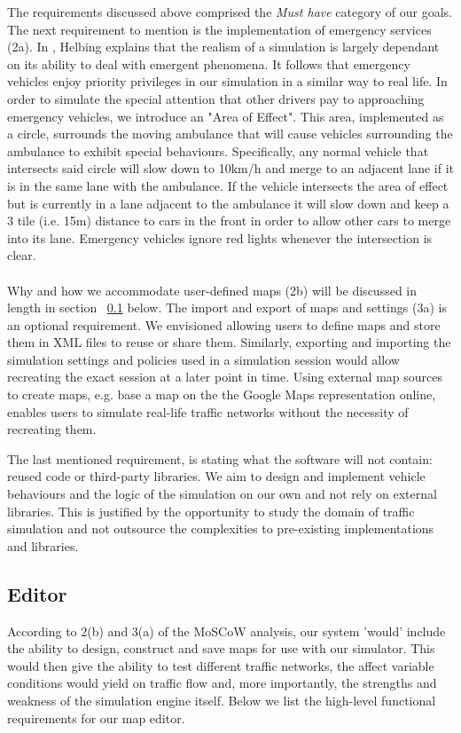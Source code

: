 The requirements discussed above comprised the \textit{Must have} category of our goals. The next requirement to mention is the implementation of emergency services (2a). In \cite{helbing2013agent}, Helbing explains that the realism of a simulation is largely dependant on its ability to deal with emergent phenomena. It follows that emergency vehicles enjoy priority privileges in our simulation in a similar way to real life. In order to simulate the special attention that other drivers pay to approaching emergency vehicles, we introduce an "Area of Effect". This area, implemented as a circle, surrounds the moving ambulance that will cause vehicles surrounding the ambulance to exhibit special behaviours. Specifically, any normal vehicle that intersects said circle will slow down to 10km/h and merge to an adjacent lane if it is in the same lane with the ambulance. If the vehicle intersects the area of effect but is currently in a lane adjacent to the ambulance it will slow down and keep a 3 tile (i.e. 15m) distance to cars in the front in order to allow other cars to merge into its lane. Emergency vehicles ignore red lights whenever the intersection is clear.
\\\\
Why and how we accommodate user-defined maps (2b) will be discussed in length in section ~\ref{ss:req-editor} below. The import and export of maps and settings (3a) is an optional requirement. We envisioned allowing users to define maps and store them in XML files to reuse or share them. Similarly, exporting and importing the simulation settings and policies used in a simulation session would allow recreating the exact session at a later point in time. Using external map sources to create maps, e.g. base a map on the the Google Maps representation online, enables users to simulate real-life traffic networks without the necessity of recreating them.

The last mentioned requirement, is stating what the software will not contain: reused code or third-party libraries. We aim to design and implement vehicle behaviours and the logic of the simulation on our own and not rely on external libraries. This is justified by the opportunity to study the domain of traffic simulation and not outsource the complexities to pre-existing implementations and libraries. 

\pagebreak

\subsection{Editor}\label{ss:req-editor}
According to 2(b) and 3(a) of the MoSCoW analysis, our system 'would' include the ability to design, construct and save maps for use with our simulator.  This would then give the ability to test different traffic networks, the affect variable conditions would yield on traffic flow and, more importantly, the strengths and weakness of the simulation engine itself. Below we list the high-level functional requirements for our map editor.

